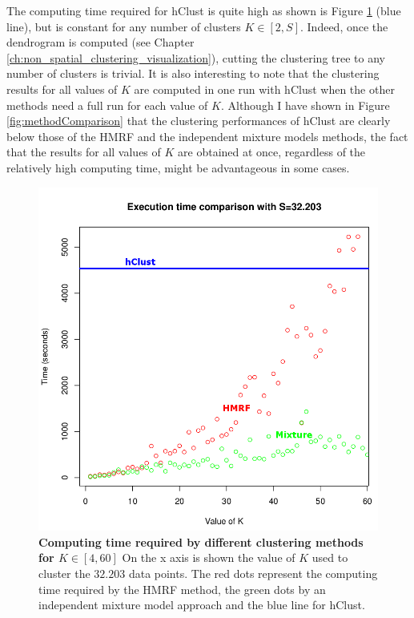 	The computing time required for hClust is quite high as shown is Figure \ref{fig:computing_time} (blue line), but is constant for any number of clusters $K \in [2,S]$. Indeed, once the dendrogram is computed (see Chapter \ref{ch:non_spatial_clustering_visualization}), cutting the clustering tree to any number of clusters is trivial. It is also interesting to note that the clustering results for all values of $K$ are computed in one run with hClust when the other methods need a full run for each value of $K$. Although I have shown in Figure \ref{fig:methodComparison} that the clustering performances of hClust are clearly below those of the HMRF and the independent mixture models methods, the fact that the results for all values of $K$ are obtained at once, regardless of the relatively high computing time, might be advantageous in some cases. 
	
	\begin{figure}[h]
\centerline{\includegraphics[width=0.8\linewidth]{gfx/chapter5/exec_time.png}}
\caption{{\bf Computing time required by different clustering methods for $K \in [4,60]$} On the x axis is shown the value of $K$ used to cluster the $32.203$ data points. The red dots represent the computing time required by the HMRF method, the green dots by an independent mixture model approach and the blue line for hClust.}
\label{fig:computing_time}
	\end{figure}
	
